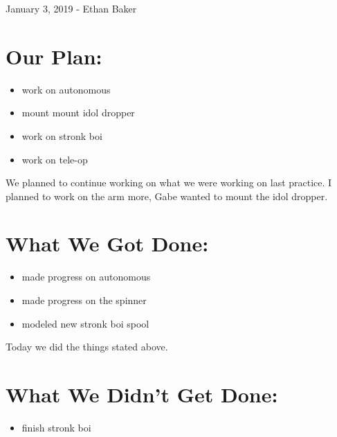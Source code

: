 \documentclass[12pt]{article}
\begin{document}
January 3, 2019 - Ethan Baker

\section{Our Plan:} %
\begin{itemize}
	\item work on autonomous
\item mount mount idol dropper
\item work on stronk boi
\item work on tele-op
\end{itemize}

We planned to continue working on what we were working on last practice. I planned to work on the arm more, Gabe wanted to mount the idol dropper.
\section{What We Got Done:} %
\begin{itemize}
	\item made progress on autonomous
\item made progress on the spinner
\item modeled new stronk boi spool

\end{itemize}

Today we did the things stated above.

\section{What We Didn't Get Done:} %
\begin{itemize}
	\item finish stronk boi
\end{itemize}
\end{document}
